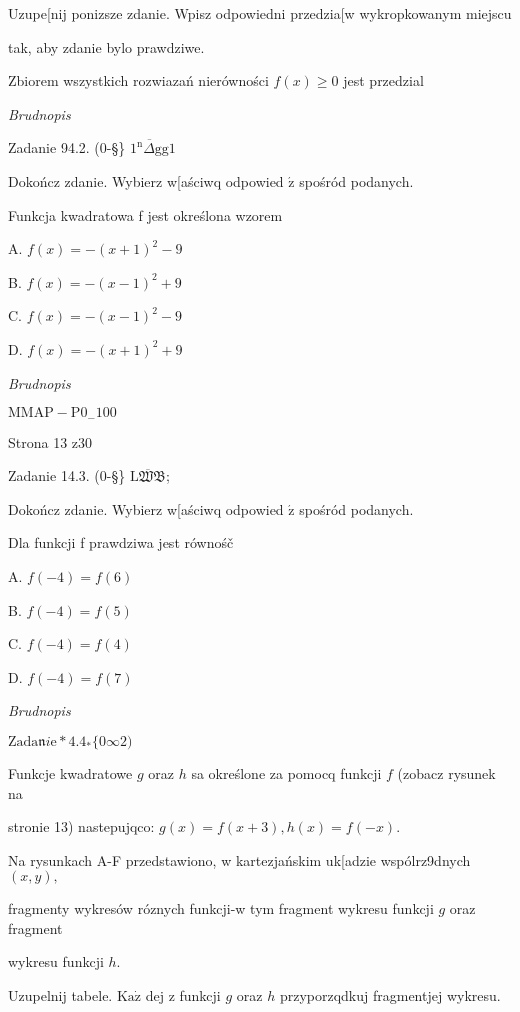 \documentclass[a4paper,12pt]{article}
\begin{document}
Uzupe[nij ponizsze zdanie. Wpisz odpowiedni przedzia[w wykropkowanym miejscu

tak, aby zdanie bylo prawdziwe.

Zbiorem wszystkich rozwiazań nierówności $f(x)\geq 0$ jest przedzial

{\it Brudnopis}

Zadanie 94.2. (0-\S\} $\overline{1^{\mathrm{n}}\Delta \mathrm{g}\mathrm{g}}1$

Dokończ zdanie. Wybierz w[aściwq odpowied $\acute{\mathrm{z}}$ spośród podanych.

Funkcja kwadratowa f jest określona wzorem

A. $f(x)=-(x+1)^{2}-9$

B. $f(x)=-(x-1)^{2}+9$

C. $f(x)=-(x-1)^{2}-9$

D. $f(x)=-(x+1)^{2}+9$

{\it Brudnopis}

$\mathrm{M}\mathrm{M}\mathrm{A}\mathrm{P}-\mathrm{P}0_{-}100$

Strona 13 z30





Zadanie 14.3. (0-\S\} $\overline{\mathrm{L}\mathfrak{W}\mathfrak{B}}$;

Dokończ zdanie. Wybierz w[aściwq odpowied $\acute{\mathrm{z}}$ spośród podanych.

Dla funkcji f prawdziwa jest równośč

A. $f(-4)=f(6)$

B. $f(-4)=f(5)$

C. $f(-4)=f(4)$

D. $f(-4)=f(7)$

{\it Brudnopis}

$\mathrm{Z}\mathrm{a}\mathrm{d}\mathrm{a}\mathfrak{n}i\mathrm{e}*4.4_{*}\{0\infty 2)$

Funkcje kwadratowe $g$ oraz $h$ sa określone za pomocq funkcji $f$ (zobacz rysunek na

stronie 13) nastepujqco: $g(x)=f(x+3), h(x)=f(-x).$

Na rysunkach A-F przedstawiono, w kartezjańskim uk[adzie wspólrz9dnych $(x,y),$

fragmenty wykresów róznych funkcji-w tym fragment wykresu funkcji $g$ oraz fragment

wykresu funkcji $h.$

Uzupelnij tabele. $\mathrm{K}\mathrm{a}\dot{\mathrm{z}}$ dej z funkcji $g$ oraz $h$ przyporzqdkuj fragmentjej wykresu.
\end{document}
